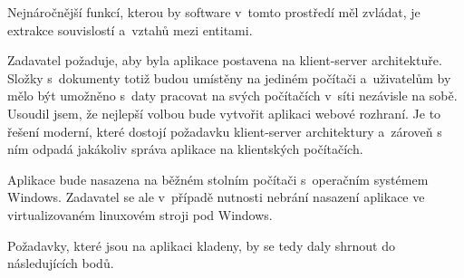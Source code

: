 Nejnáročnější funkcí, kterou by software v~tomto prostředí měl zvládat, je extrakce souvislostí a~vztahů mezi entitami.

Zadavatel požaduje, aby byla aplikace postavena na klient-server architektuře. Složky s~dokumenty totiž budou umístěny na jediném počítači a~uživatelům by mělo být umožněno s~daty pracovat na svých počítačích v~síti nezávisle na sobě. Usoudil jsem, že nejlepší volbou bude vytvořit aplikaci webové rozhraní. Je to řešení moderní, které dostojí požadavku klient-server architektury a~zároveň s ním odpadá jakákoliv správa aplikace na klientských počítačích.

Aplikace bude nasazena na běžném stolním počítači s~operačním systémem Windows. Zadavatel se ale v~případě nutnosti nebrání nasazení aplikace ve virtualizovaném linuxovém stroji pod Windows.

Požadavky, které jsou na aplikaci kladeny, by se tedy daly shrnout do následujících bodů.

